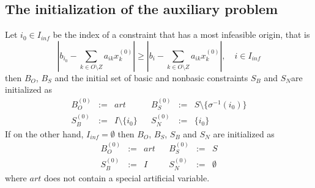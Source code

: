 \documentclass[a4paper]{article}
\begin{document}
\subsection{The initialization of the auxiliary problem}
Let $i_{0} \in I_{inf}$ be the index of a constraint that has a most infeasible
origin, that is 
\begin{equation}
  \left| b_{i_{0}}-\sum_{k \in O \setminus Z}a_{ik}x_{k}^{(0)} \right|
  \geq 
  \left|b_{i}-\sum_{k \in O \setminus Z}a_{ik}x_{k}^{(0)}\right|,
    \quad i \in I_{inf}
\end{equation}
then $B_{O}$, $B_{S}$ and the initial set of basic and nonbasic constraints
$S_{B}$ and $S_{N}$are initialized as
\begin{equation}
\begin{array}{ccccccc}
  \label{def:headings_init_io}
B_{O}^{(0)} &:=& art && B_{S}^{(0)} &:=& S \setminus
  \{\sigma^{-1}\left(i_{0}\right)\} \\
S_{B}^{(0)} &:=& I \setminus \{i_{0}\} && S_{N}^{(0)} & := & \{ i_{0} \} 
\end{array}
\end{equation}
If on the other hand, $I_{inf}=\emptyset$ then $B_{O}$, $B_{S}$, $S_{B}$ and
$S_{N}$ are initialized as
\begin{equation}
\begin{array}{ccccccc}
\label{def:headings_init_fo}
B_{O}^{(0)} &:=& art && B_{S}^{(0)} &:=& S \\
S_{B}^{(0)} &:=&I && S_{N}^{(0)}&:=& \emptyset
\end{array}
\end{equation}
where $art$ does not contain a special artificial variable.
\end{document}
